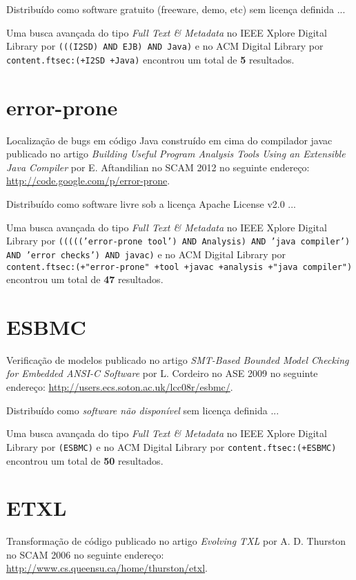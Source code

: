 Distribuído como software gratuito (freeware, demo, etc)
sem licença definida ...


Uma busca avançada do tipo {\it Full Text \& Metadata} no IEEE Xplore Digital Library por
\texttt{(((I2SD) AND EJB) AND Java)}
e no ACM Digital Library por
\texttt{content.ftsec:(+I2SD +Java)}
encontrou um total de
{\bf 5}
resultados.

\section{error-prone}

Localização de bugs em código Java construído em cima do compilador javac
publicado no artigo
{\it Building Useful Program Analysis Tools Using an Extensible Java Compiler}
por
E. Aftandilian
no
SCAM
2012
no seguinte endereço:
\url{http://code.google.com/p/error-prone}.

Distribuído como software livre
sob a licença Apache License v2.0 ...


Uma busca avançada do tipo {\it Full Text \& Metadata} no IEEE Xplore Digital Library por
\texttt{((((('error-prone tool') AND Analysis) AND 'java compiler') AND 'error checks') AND javac)}
e no ACM Digital Library por
\texttt{content.ftsec:(+"error-prone" +tool +javac +analysis +"java compiler")}
encontrou um total de
{\bf 47}
resultados.

\section{ESBMC}

Verificação de modelos
publicado no artigo
{\it SMT-Based Bounded Model Checking for Embedded ANSI-C Software}
por
L. Cordeiro
no
ASE
2009
no seguinte endereço:
\url{http://users.ecs.soton.ac.uk/lcc08r/esbmc/}.

Distribuído como {\it software não disponível}
sem licença definida ...


Uma busca avançada do tipo {\it Full Text \& Metadata} no IEEE Xplore Digital Library por
\texttt{(ESBMC)}
e no ACM Digital Library por
\texttt{content.ftsec:(+ESBMC)}
encontrou um total de
{\bf 50}
resultados.

\section{ETXL}

Transformação de código
publicado no artigo
{\it Evolving TXL}
por
A. D. Thurston
no
SCAM
2006
no seguinte endereço:
\url{http://www.cs.queensu.ca/home/thurston/etxl}.

